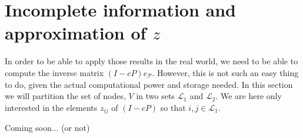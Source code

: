 \documentclass{article}
\newcommand{\1}{\mathbf{1}}
\theoremstyle{definition}
\begin{document}
\section{Incomplete information and approximation of \(z\)}
In order to be able to apply those results in the real world, we need to be able to compute the inverse matrix \((I-cP)e_{\mathcal{P}}\). However, this is not such an easy thing to do, given the actual computational power and storage needed. In this section we will partition the set of nodes, \(V\) in two sets \(\mathcal{L}_1\) and \(\mathcal{L}_2\). We are here only interested in the elements \(z_{ij}\) of \((I-cP)\) so that \(i,j \in \mathcal{L}_1\).

Coming soon... (or not)



\end{document}
